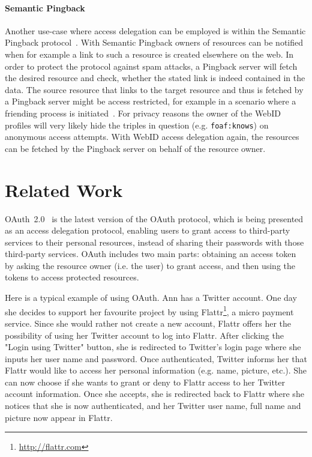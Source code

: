 \documentclass[a4paper]{llncs}
\begin{document}
\paragraph{Semantic Pingback}
Another use-case where access delegation can be employed is within the Semantic Pingback protocol~\cite{tramp-s-2010--b}.
With Semantic Pingback owners of resources can be notified when for example a link to such a resource is created elsewhere on the web.
In order to protect the protocol against spam attacks, a Pingback server will fetch the desired resource and check, whether the stated link is indeed contained in the data.
The source resource that links to the target resource and thus is fetched by a Pingback server might be access restricted, for example in a scenario where a friending process is initiated~\cite{story-h-2011--a}.
For privacy reasons the owner of the WebID profiles will very likely hide the triples in question (e.g. \texttt{foaf:knows}) on anonymous access attempts.
With WebID access delegation again, the resources can be fetched by the Pingback server on behalf of the resource owner.

\section{Related Work}\label{sec:relatedwork}

OAuth~2.0~\cite{hardt-d-2012--a} is the latest version of the OAuth protocol, which is being presented as an access delegation protocol, enabling users to grant access to third-party services to their personal resources, instead of sharing their passwords with those third-party services.
OAuth includes two main parts: obtaining an access token by asking the resource owner (i.e. the user) to grant access, and then using the tokens to access protected resources. 

Here is a typical example of using OAuth. 
Ann has a Twitter account.
One day she decides to support her favourite project by using Flattr\footnote{\url{http://flattr.com}}, a micro payment service.
Since she would rather not create a new account, Flattr offers her the possibility of using her Twitter account to log into Flattr.
After clicking the "Login using Twitter" button, she is redirected to Twitter's login page where she inputs her user name and password.
Once authenticated, Twitter informs her that Flattr would like to access her personal information (e.g. name, picture, etc.).
She can now choose if she wants to grant or deny to Flattr access to her Twitter account information.
Once she accepts, she is redirected back to Flattr where she notices that she is now authenticated, and her Twitter user name, full name and picture now appear in Flattr.
\end{document}
